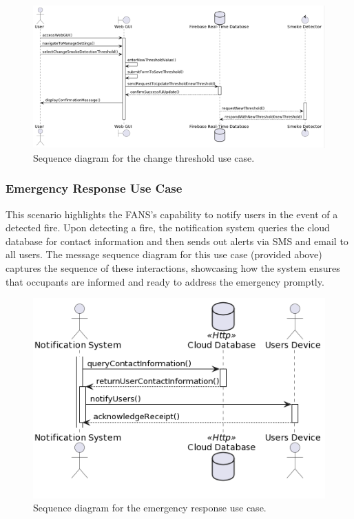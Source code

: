 \begin{figure}[H]
    \centering
    \includegraphics[width=\linewidth]{../assets/sequence/ChangingSmokeDetectionThresholdSequenceDiagram.png}
    \caption{Sequence diagram for the change threshold use case.}
\end{figure}

\subsubsection{Emergency Response Use Case}

This scenario highlights the FANS's capability to notify users in the event of a detected fire. Upon detecting a fire,
the notification system queries the cloud database for contact information and then sends out alerts via SMS and email
to all users. The message sequence diagram for this use case (provided above) captures the sequence of these
interactions, showcasing how the system ensures that occupants are informed and ready to address the emergency
promptly.

\begin{figure}[H]
    \centering
    \includegraphics[width=\linewidth]{../assets/sequence/UserNotificationSequenceDiagram.png}
    \caption{Sequence diagram for the emergency response use case.}
\end{figure}


